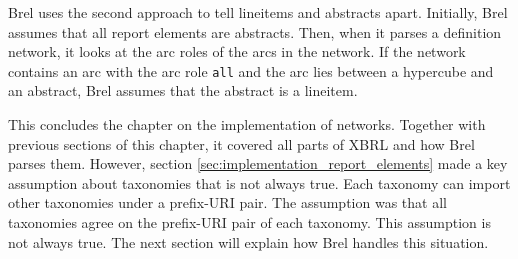 Brel uses the second approach to tell lineitems and abstracts apart.
Initially, Brel assumes that all report elements are abstracts.
Then, when it parses a definition network, it looks at the arc roles of the arcs in the network.
If the network contains an arc with the arc role \texttt{all} and the arc lies between a hypercube and an abstract, Brel assumes that the abstract is a lineitem.


This concludes the chapter on the implementation of networks.
Together with previous sections of this chapter, it covered all parts of XBRL and how Brel parses them.
However, section \ref{sec:implementation_report_elements} made a key assumption about taxonomies that is not always true.
Each taxonomy can import other taxonomies under a prefix-URI pair.
The assumption was that all taxonomies agree on the prefix-URI pair of each taxonomy.
This assumption is not always true.
The next section will explain how Brel handles this situation. 